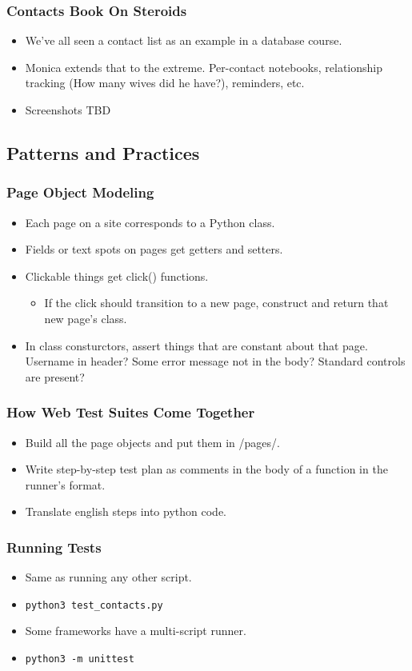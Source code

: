 \begin{frame}
  \frametitle{Contacts Book On Steroids}
  \begin{itemize}
    \item We've all seen a contact list as an example in a database course.
    \item Monica extends that to the extreme. Per-contact notebooks, relationship tracking (How many wives did he have?), reminders, etc.
    \item Screenshots TBD
  \end{itemize}
\end{frame}

\subsection{Patterns and Practices}

\begin{frame}
  \frametitle{Page Object Modeling}
  \begin{itemize}
    \item Each page on a site corresponds to a Python class.
    \item Fields or text spots on pages get getters and setters.
    \item Clickable things get click() functions.
    \begin{itemize}
      \item If the click should transition to a new page, construct and return that new page's class.
    \end{itemize}
    \item In class consturctors, assert things that are constant about that page. Username in header? Some error message not in the body? Standard controls are present?
  \end{itemize}
\end{frame}

\begin{frame}
  \frametitle{How Web Test Suites Come Together}
  \begin{itemize}
    \item Build all the page objects and put them in /pages/.
    \item Write step-by-step test plan as comments in the body of a function in the runner's format.
    \item Translate english steps into python code.
  \end{itemize}
\end{frame}

\begin{frame}
  \frametitle{Running Tests}
  \begin{itemize}
    \item Same as running any other script.
    \item \texttt{python3 test\_contacts.py}
    \item Some frameworks have a multi-script runner.
    \item \texttt{python3 -m unittest}
  \end{itemize}
\end{frame}
